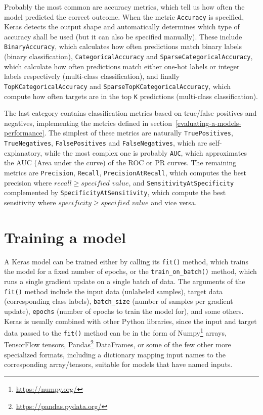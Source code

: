 Probably the most common are accuracy metrics, which tell us how often the model predicted the correct outcome.
When the metric \texttt{Accuracy} is specified,
Keras detects the output shape and automatically determines which type of accuracy shall be used
(but it can also be specified manually).
These include \texttt{BinaryAccuracy}, which calculates how often predictions match binary labels (binary classification),
\texttt{CategoricalAccuracy} and \texttt{SparseCategoricalAccuracy}, which calculate how often predictions match either one-hot labels or integer labels respectively (multi-class classification),
and finally\\ \texttt{TopKCategoricalAccuracy} and \texttt{SparseTopKCategoricalAccuracy}, which compute how often targets
are in the top \texttt{K} predictions (multi-class classification).

The last category contains classification metrics based on true/false positives and negatives,
implementing the metrics defined in section~\ref{evaluating-a-models-performance}.
The simplest of these metrics are naturally \texttt{TruePositives}, \texttt{TrueNegatives}, \texttt{FalsePositives} and
\texttt{FalseNegatives}, which are self-explanatory, while the most complex one is probably \texttt{AUC},
which approximates the AUC (Area under the curve) of the ROC or
PR curves. The remaining metrics are \texttt{Precision},
\texttt{Recall}, \texttt{PrecisionAtRecall}, which computes the best precision
where $recall \geq specified$ $value$, and \texttt{SensitivityAtSpecificity} complemented by \texttt{SpecificityAtSensitivity},
which compute the best sensitivity where $specificity \geq specified$ $value$ and vice versa.




\section{Training a model}
\label{training-a-model}
A Keras model can be trained either by calling its \texttt{fit()} method, which trains the model for a fixed number
of epochs, or the \texttt{train\_on\_batch()} method, which runs a single gradient update on a single batch of data.
The arguments of the \texttt{fit()} method include the input data (unlabeled samples), target data (corresponding
class labels), \texttt{batch\_size} (number of samples per gradient update), \texttt{epochs} (number of epochs to train
the model for), and some others. Keras is usually combined with other Python libraries, since the input and target data
passed to the \texttt{fit()} method can be in the form of Numpy\footnote{\url{https://numpy.org/}} arrays,
TensorFlow tensors, Pandas\footnote{\url{https://pandas.pydata.org/}} DataFrames, or some of the few other more
specialized formats, including a dictionary mapping input names to the corresponding array/tensors, suitable for
models that have named inputs.

